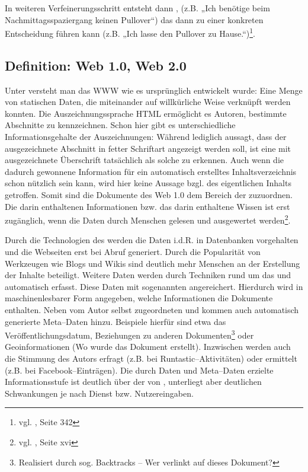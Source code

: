 In weiteren Verfeinerungsschritt entsteht dann , (z.B. „Ich benötige beim Nachmittagsspaziergang keinen Pullover“) das dann zu einer konkreten Entscheidung führen kann (z.B. „Ich lasse den Pullover zu Hause.“)\footnote{vgl. \cite{taylor}, Seite 342}.

\subsection{Definition: Web 1.0, Web 2.0}

Unter  versteht man das \ac{WWW} wie es ursprünglich entwickelt wurde: Eine Menge von statischen Daten, die miteinander auf willkürliche Weise verknüpft werden konnten. Die Auszeichnungssprache \ac{HTML} ermöglicht es Autoren, bestimmte Abschnitte zu kennzeichnen. Schon hier gibt es unterschiedliche Informationsgehalte der Auszeichnungen: Während  lediglich aussagt, dass der ausgezeichnete Abschnitt in fetter Schriftart angezeigt werden soll, ist eine mit  ausgezeichnete Überschrift tatsächlich als solche zu erkennen. Auch wenn die dadurch gewonnene Information für ein automatisch erstelltes Inhaltsverzeichnis schon nützlich sein kann, wird hier keine Aussage bzgl. des eigentlichen Inhalts getroffen. Somit sind die Dokumente des Web 1.0 dem Bereich der  zuzuordnen. Die darin enthaltenen Informationen bzw. das darin enthaltene Wissen ist erst zugänglich, wenn die Daten durch Menschen gelesen und ausgewertet werden\footnote{vgl. \cite{alkhatib}, Seite xvi}.

Durch die Technologien des  werden die Daten i.d.R. in Datenbanken vorgehalten und die Webseiten erst bei Abruf generiert. Durch die Popularität von Werkzeugen wie Blogs und Wikis sind deutlich mehr Menschen an der Erstellung der Inhalte beteiligt. Weitere Daten werden durch Techniken rund um das  und  automatisch erfasst. Diese Daten mit sogenannten  angereichert. Hierdurch wird in maschinenlesbarer Form angegeben, welche Informationen die Dokumente enthalten. Neben vom Autor selbst zugeordneten  und  kommen auch automatisch generierte Meta--Daten hinzu. Beispiele hierfür sind etwa das Veröffentlichungsdatum, Beziehungen zu anderen Dokumenten\footnote{Realisiert durch sog. Backtracks -- Wer verlinkt auf dieses Dokument?} oder Geoinformationen (Wo wurde das Dokument erstellt). Inzwischen werden auch die Stimmung des Autors erfragt (z.B. bei Runtastic–Aktivitäten) oder ermittelt (z.B. bei Facebook--Einträgen). Die durch Daten und Meta--Daten erzielte Informationsstufe ist deutlich über der von , unterliegt aber deutlichen Schwankungen je nach Dienst bzw. Nutzereingaben.

